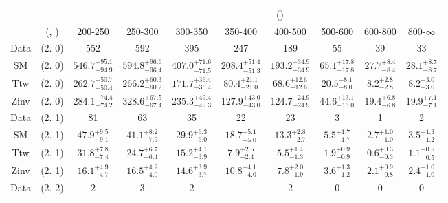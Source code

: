 \begin{table}[h!]
\tiny
\centering
{}
\begin{tabular}
{cccccccccc}
	\hline\hline
&	&	& \multicolumn{8}{c}{\scalht (\gev)}\\ 
	&	 (\njet, \nb) & 200-250 & 250-300 & 300-350 & 350-400 & 400-500 & 500-600 & 600-800 & 800-$\infty$ \\ [0.8ex] 
\hline
	Data & (2. 0) & 552 & 592 & 395 & 247 & 189 & 55 & 39 & 33 \\[0.5ex] 
	SM & (2. 0) & $546.7^{+ 95.1 }_{- 94.9 }$ & $594.8^{+ 96.6 }_{- 96.4 }$ & $407.0^{+ 71.6 }_{- 71.5 }$ & $208.4^{+ 51.4 }_{- 51.3 }$ & $193.2^{+ 34.9 }_{- 34.9 }$ & $65.1^{+ 17.8 }_{- 17.8 }$ & $27.7^{+ 8.4 }_{- 8.4 }$ & $28.1^{+ 8.7 }_{- 8.7 }$ \\[0.5ex] 
	Ttw & (2. 0) & $262.7^{+ 50.7 }_{- 50.4 }$ & $266.2^{+ 60.3 }_{- 60.2 }$ & $171.7^{+ 36.4 }_{- 36.4 }$ & $80.4^{+ 21.1 }_{- 21.0 }$ & $68.6^{+ 12.6 }_{- 12.6 }$ & $20.5^{+ 8.1 }_{- 8.0 }$ & $8.2^{+ 2.8 }_{- 2.8 }$ & $8.2^{+ 3.0 }_{- 3.0 }$ \\[0.5ex] 
	Zinv & (2. 0) & $284.1^{+ 74.4 }_{- 74.2 }$ & $328.6^{+ 67.5 }_{- 67.4 }$ & $235.3^{+ 49.4 }_{- 49.3 }$ & $127.9^{+ 43.0 }_{- 43.0 }$ & $124.7^{+ 24.9 }_{- 24.9 }$ & $44.6^{+ 13.1 }_{- 13.0 }$ & $19.4^{+ 6.8 }_{- 6.8 }$ & $19.9^{+ 7.1 }_{- 7.1 }$ \\[0.5ex] 
	Data & (2. 1) & 81 & 63 & 35 & 22 & 23 & 3 & 1 & 2 \\[0.5ex] 
	SM & (2. 1) & $47.9^{+ 9.5 }_{- 9.1 }$ & $41.1^{+ 8.2 }_{- 7.9 }$ & $29.9^{+ 6.3 }_{- 6.0 }$ & $18.7^{+ 5.1 }_{- 5.0 }$ & $13.3^{+ 2.8 }_{- 2.7 }$ & $5.5^{+ 1.7 }_{- 1.7 }$ & $2.7^{+ 1.0 }_{- 1.0 }$ & $3.5^{+ 1.3 }_{- 1.2 }$ \\[0.5ex] 
	Ttw & (2. 1) & $31.8^{+ 7.8 }_{- 7.4 }$ & $24.7^{+ 6.7 }_{- 6.4 }$ & $15.2^{+ 4.1 }_{- 3.9 }$ & $7.9^{+ 2.5 }_{- 2.4 }$ & $5.5^{+ 1.4 }_{- 1.3 }$ & $1.9^{+ 0.9 }_{- 0.9 }$ & $0.6^{+ 0.3 }_{- 0.3 }$ & $1.1^{+ 0.5 }_{- 0.5 }$ \\[0.5ex] 
	Zinv & (2. 1) & $16.1^{+ 4.9 }_{- 4.7 }$ & $16.5^{+ 4.2 }_{- 4.0 }$ & $14.6^{+ 3.9 }_{- 3.7 }$ & $10.8^{+ 4.1 }_{- 4.0 }$ & $7.8^{+ 2.0 }_{- 1.9 }$ & $3.6^{+ 1.3 }_{- 1.2 }$ & $2.1^{+ 0.9 }_{- 0.8 }$ & $2.4^{+ 1.0 }_{- 1.0 }$ \\[0.5ex] 
	Data & (2. 2) & 2 & 3 & 2 & -- & 2 & 0 & 0 & 0 \\[0.5ex] 

\end{tabular}
\end{table}

